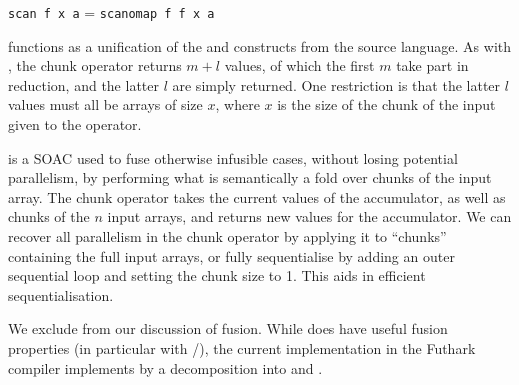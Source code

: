 \begin{description}
  \centerline{\lstinline{scan f x a} = \lstinline{scanomap f f x a}}
\item[\kw{stream\_par}] functions as a unification of the
   and  constructs from the source
  language.  As with , the chunk operator returns $m+l$
  values, of which the first $m$ take part in reduction, and the
  latter $l$ are simply returned.  One restriction is that the latter
  $l$ values must all be arrays of size $x$, where $x$ is the size of
  the chunk of the input given to the operator.
\item[\kw{stream\_seq}] is a SOAC used to fuse otherwise infusible
  cases, without losing potential parallelism, by performing what is
  semantically a fold over chunks of the input array.  The chunk
  operator takes the current values of the accumulator, as well as
  chunks of the $n$ input arrays, and returns new values for the
  accumulator.  We can recover all parallelism in the chunk operator
  by applying it to ``chunks'' containing the full input arrays, or
  fully sequentialise by adding an outer sequential loop and setting
  the chunk size to 1.  This aids in efficient sequentialisation.
\end{description}

We exclude  from our discussion of fusion.  While
 does have useful fusion properties (in particular with
/), the current implementation in the Futhark
compiler implements  by a decomposition into  and
.

